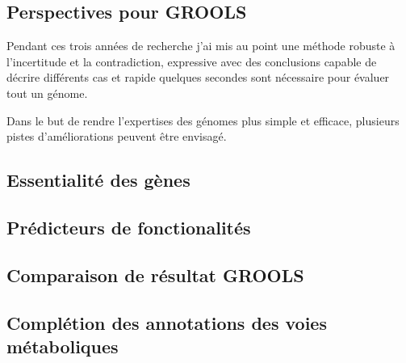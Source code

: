 
\begin{refsegment}
\chapter{Perspectives pour GROOLS}

Pendant ces trois années de recherche j'ai mis au point une méthode robuste à l'incertitude et la contradiction, expressive avec des conclusions capable de décrire différents cas et rapide quelques secondes sont nécessaire pour évaluer tout un génome.

Dans le but de rendre l'expertises des génomes plus simple et efficace, plusieurs pistes d'améliorations peuvent être envisagé.

\section{Essentialité des gènes}
\section{Prédicteurs de fonctionalités}
\section{Comparaison de résultat GROOLS}
\section{Complétion des annotations des voies métaboliques}


\subbibliography
\end{refsegment}